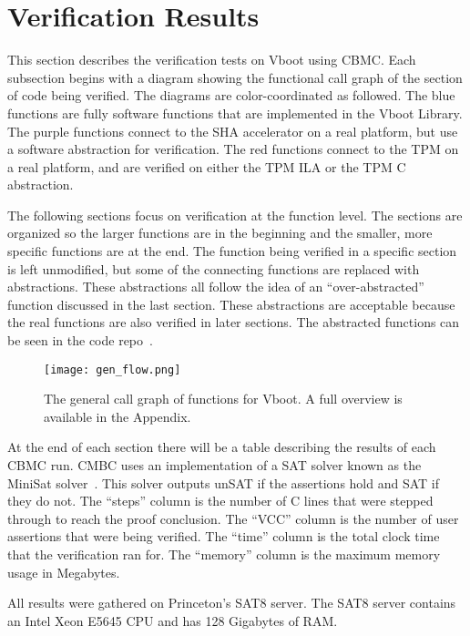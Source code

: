 \chapter{Verification Results}\label{sec:VerifResults}

This section describes the verification tests on Vboot using CBMC\@.
Each subsection begins with a diagram showing the functional call graph of the section of code  being verified.
The diagrams are color-coordinated as followed.
The blue functions are fully software functions that are implemented in the Vboot Library.
The purple functions connect to the SHA accelerator on a real platform, 
but use a software abstraction for verification.
The red functions connect to the TPM on a real platform, and are 
verified on either the TPM ILA or the TPM C abstraction.

The following sections focus on verification at the function level.
The sections are organized so the larger functions are in the beginning and the smaller, more specific functions are at the end. 
The function being verified in a specific section is left unmodified, but some of the connecting functions are replaced with abstractions.
These abstractions all follow the idea of an ``over-abstracted'' function discussed in the last section.
These abstractions are acceptable because the real functions are also verified in later sections.
The abstracted functions can be seen in the code repo~\cite{my-repo}.

 \begin{figure}[!htbp]
   \centering
   \texttt{[image: gen\_flow.png]}
   \caption[Vboot General Call Graph]{The general call graph of functions for Vboot. A full overview is available in the Appendix.}\label{fig:allflow}
 \end{figure}

At the end of each section there will be a table describing the results of each CBMC run.
CMBC uses an implementation of a SAT solver known as the MiniSat solver~\cite{minisat}.
This solver outputs unSAT if the assertions hold and SAT if they do not. 
The ``steps'' column is the number of C lines that were stepped through to reach the proof conclusion.
The ``VCC'' column is the number of user assertions that were being verified.
The ``time'' column is the total clock time that the verification ran for.
The ``memory'' column is the maximum memory usage in Megabytes.

All results were gathered on Princeton's SAT8 server. 
The SAT8 server contains an Intel Xeon E5645 CPU and has 128 Gigabytes of RAM.

